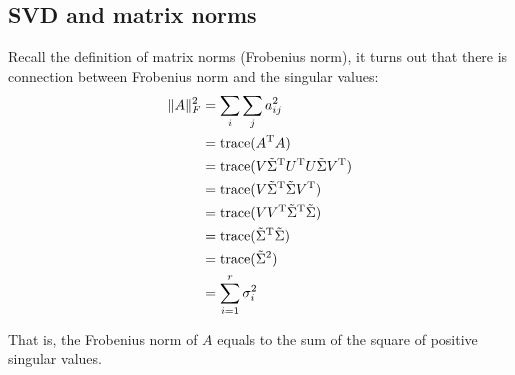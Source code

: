 \subsection{SVD and matrix norms}
Recall the definition of matrix norms (Frobenius norm), it turns out that there is connection between Frobenius norm and the singular values:
\begin{align*}
\Vert A\Vert_F^2 
&=\sum_i \sum_j	a_{ij}^2\\
&=\operatorname{trace}(A^{{\rm T}}A)\\
&=\operatorname{trace}(V\tilde{\Sigma}^{{\rm T}} U^{{\rm T}} U \tilde{\Sigma} V^{{\rm T}})\\
&=\operatorname{trace}(V \tilde{\Sigma}^{{\rm T}} \tilde{\Sigma} V^{{\rm T}})\\
&=\operatorname{trace}(V V^{{\rm T}} \tilde{\Sigma}^{{\rm T}} \tilde{\Sigma})\\
&=\operatorname{trace}(\tilde{\Sigma}^{{\rm T}} \tilde{\Sigma})\\
&=\operatorname{trace}(\tilde{\Sigma}^2)\\
&=\sum_{i=1}^{r} \sigma_i^2
\end{align*}

That is, the Frobenius norm of $A$ equals to the sum of the square of positive singular values.